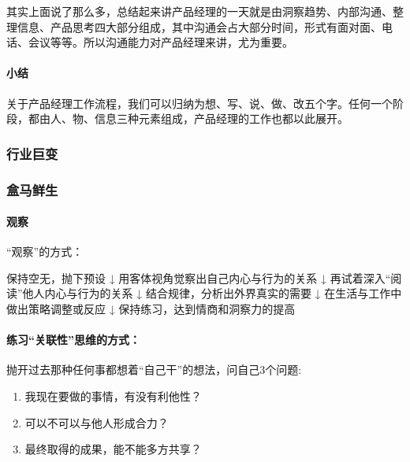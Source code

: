 \documentclass[letterpaper,11pt,english]{sphinxmanual}
\begin{document}
其实上面说了那么多，总结起来讲产品经理的一天就是由洞察趋势、内部沟通、整理信息、产品思考四大部分组成，其中沟通会占大部分时间，形式有面对面、电话、会议等等。所以沟通能力对产品经理来讲，尤为重要。


\paragraph{小结}
\label{\detokenize{chapter_experience/1Day:id3}}
关于产品经理工作流程，我们可以归纳为想、写、说、做、改五个字。任何一个阶段，都由人、物、信息三种元素组成，产品经理的工作也都以此展开。


\subsubsection{行业巨变}
\label{\detokenize{chapter_experience/issue:id1}}\label{\detokenize{chapter_experience/issue::doc}}

\subsubsection{盒马鲜生}
\label{\detokenize{chapter_experience/hema:id1}}\label{\detokenize{chapter_experience/hema::doc}}

\paragraph{观察}
\label{\detokenize{chapter_experience/hema:id2}}
“观察”的方式：

保持空无，抛下预设 ↓ 用客体视角觉察出自己内心与行为的关系 ↓
再试着深入“阅读”他人内心与行为的关系 ↓ 结合规律，分析出外界真实的需要 ↓
在生活与工作中做出策略调整或反应 ↓ 保持练习，达到情商和洞察力的提高


\paragraph{练习“关联性”思维的方式：}
\label{\detokenize{chapter_experience/hema:id3}}
抛开过去那种任何事都想着“自己干”的想法，问自己3个问题:
\begin{enumerate}
%
\item {} 
我现在要做的事情，有没有利他性？

\item {} 
可以不可以与他人形成合力？

\item {} 
最终取得的成果，能不能多方共享？

\end{enumerate}
\end{document}
